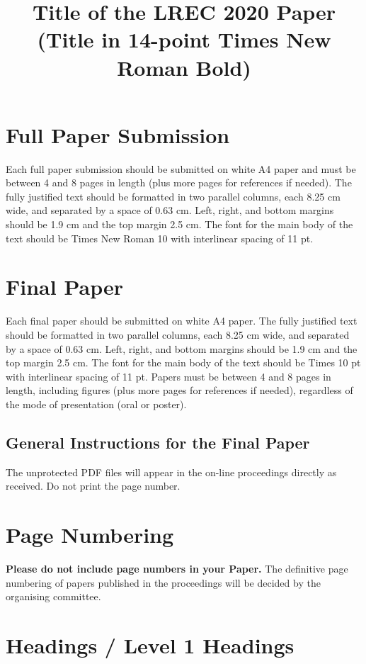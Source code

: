 \documentclass[10pt, a4paper]{article}
\title{Title of the LREC 2020 Paper (Title in 14-point Times New Roman Bold)\\ \vspace*{.5\baselineskip} \normalfont{ The Title \ul{Must Be} Capitalised as in:\\ \vspace*{.5\baselineskip} \textbf{The Rise and Fall of Ziggy Stardust and the Spiders from Mars}}}
\begin{document}
\maketitleabstract

\section{Full Paper Submission}

Each full paper submission should be submitted on white A4 paper and must be between 4 and 8 pages in length (plus more pages for references if needed).
The fully
justified text should be formatted in two parallel columns, each 8.25 cm wide,
and separated by a space of 0.63 cm. Left, right, and bottom margins should be
1.9 cm and the top margin 2.5 cm. The font for the main body of the text should
be Times New Roman 10 with interlinear spacing of 11 pt.


\section{ Final Paper}

Each final paper should be submitted on white A4 paper. The fully justified text should be formatted in two parallel columns, each 8.25 cm wide, and separated by a space of 0.63 cm. Left, right, and bottom margins should be 1.9 cm and the top margin 2.5 cm. The font for the main body of the text should be Times 10 pt with interlinear spacing of 11 pt. Papers must be between 4 and 8 pages in length, including figures (plus more pages for references if needed), regardless of the mode of presentation (oral or poster).

\subsection{General Instructions for the Final Paper}
The unprotected PDF files will appear in the
on-line proceedings directly as received. Do not print the page number.

\section{Page Numbering}

\textbf{Please do not include page numbers in your Paper.} The definitive page
numbering of papers published in the proceedings will be decided by the
organising committee.

\section{Headings / Level 1 Headings}
\end{document}
